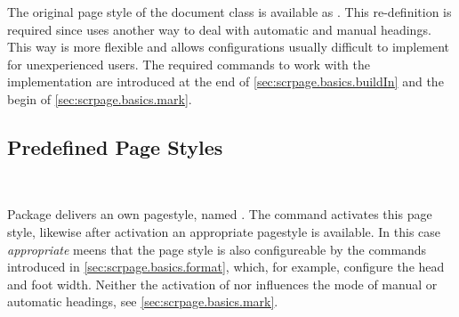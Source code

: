 The original  page style of the document class is available
as . This re-definition is required since
 uses another way to deal with automatic and manual
headings. This way is more flexible and allows configurations usually
difficult to implement for unexperienced users. The required commands to work
with the  implementation are introduced at the end of
\autoref{sec:scrpage.basics.buildIn} and the begin of
\autoref{sec:scrpage.basics.mark}.

\subsection{Predefined Page Styles}\label{sec:scrpage.basics.buildIn}

\begin{Declaration}
  \\
\end{Declaration}%
%
%
%
Package  delivers an own pagestyle, named
.
The command  activates
this page style, likewise
after activation an appropriate  pagestyle
is available.
In this case \emph{appropriate} meens that the 
page style is also configureable by the commands introduced in
\autoref{sec:scrpage.basics.format}, which, for example,
configure the head and foot width.
Neither the activation of  nor 
influences the mode of manual or automatic headings,
see \autoref{sec:scrpage.basics.mark}.

